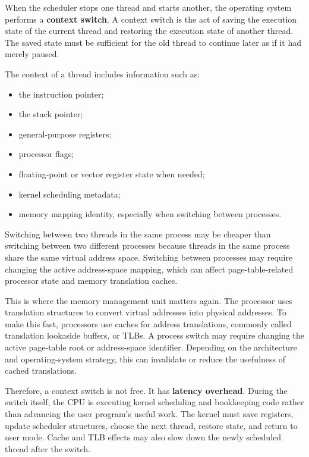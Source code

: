 When the scheduler stops one thread and starts another, the operating system performs a \textbf{context switch}. A context switch is the act of saving the execution state of the current thread and restoring the execution state of another thread. The saved state must be sufficient for the old thread to continue later as if it had merely paused.

The context of a thread includes information such as:

\begin{itemize}
    \item the instruction pointer;
    \item the stack pointer;
    \item general-purpose registers;
    \item processor flags;
    \item floating-point or vector register state when needed;
    \item kernel scheduling metadata;
    \item memory mapping identity, especially when switching between processes.
\end{itemize}

Switching between two threads in the same process may be cheaper than switching between two different processes because threads in the same process share the same virtual address space. Switching between processes may require changing the active address-space mapping, which can affect page-table-related processor state and memory translation caches.

This is where the memory management unit matters again. The processor uses translation structures to convert virtual addresses into physical addresses. To make this fast, processors use caches for address translations, commonly called translation lookaside buffers, or TLBs. A process switch may require changing the active page-table root or address-space identifier. Depending on the architecture and operating-system strategy, this can invalidate or reduce the usefulness of cached translations.

Therefore, a context switch is not free. It has \textbf{latency overhead}. During the switch itself, the CPU is executing kernel scheduling and bookkeeping code rather than advancing the user program's useful work. The kernel must save registers, update scheduler structures, choose the next thread, restore state, and return to user mode. Cache and TLB effects may also slow down the newly scheduled thread after the switch.

